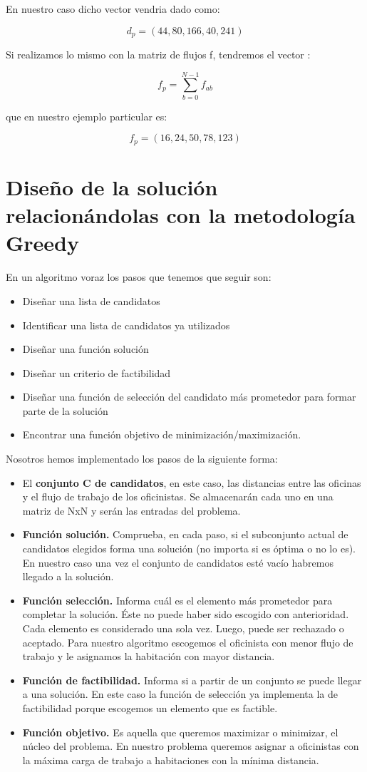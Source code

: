 \documentclass[11pt, a4paper]{article}
\theoremstyle{theorem-style}
\theoremstyle{definition-style}
\theoremstyle{remark-style}
\theoremstyle{example-style}
\begin{document}
En nuestro caso dicho vector vendria dado como:

\[
d_{p}=(44,80,166,40,241)
\]

Si realizamos lo mismo con la matriz de flujos f, tendremos el vector
:

\[
f_{p}={\displaystyle \sum_{b=0}^{N-1}f_{ab}}
\]

que en nuestro ejemplo particular es:

\[
f_{p}=(16,24,50,78,123)
\]


\section{Diseño de la solución relacionándolas con la metodología Greedy}

En un algoritmo voraz los pasos que tenemos que seguir son: 
\begin{itemize}
\item Diseñar una lista de candidatos 
\item Identificar una lista de candidatos ya utilizados 
\item Diseñar una función solución 
\item Diseñar un criterio de factibilidad
\item Diseñar una función de selección del candidato más prometedor para
formar parte de la solución 
\item Encontrar una función objetivo de minimización/maximización. 
\end{itemize}
Nosotros hemos implementado los pasos de la siguiente forma:
\begin{itemize}
\item El \textbf{conjunto C de candidatos}, en este caso, las distancias
entre las oficinas y el flujo de trabajo de los oficinistas. Se almacenarán
cada uno en una matriz de NxN y serán las entradas del problema.
\item \textbf{Función solución.} Comprueba, en cada paso, si el subconjunto
actual de candidatos elegidos forma una solución (no importa si es
óptima o no lo es). En nuestro caso una vez el conjunto de candidatos
esté vacío habremos llegado a la solución. 
\item \textbf{Función selección.} Informa cuál es el elemento más prometedor
para completar la solución. Éste no puede haber sido escogido con
anterioridad. Cada elemento es considerado una sola vez. Luego, puede
ser rechazado o aceptado. Para nuestro algoritmo escogemos el oficinista
con menor flujo de trabajo y le asignamos la habitación con mayor
distancia.
\item \textbf{Función de factibilidad.} Informa si a partir de un conjunto
se puede llegar a una solución. En este caso la función de selección
ya implementa la de factibilidad porque escogemos un elemento que
es factible.
\item \textbf{Función objetivo.} Es aquella que queremos maximizar o minimizar,
el núcleo del problema. En nuestro problema queremos asignar a oficinistas
con la máxima carga de trabajo a habitaciones con la mínima distancia. 
\end{itemize}
\end{document}

